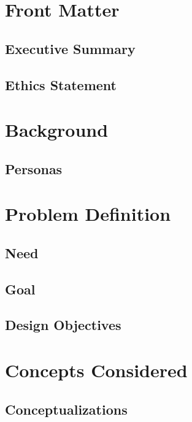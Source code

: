 \documentclass{article}
\begin{document}
\maketitle
\newpage

\section{Front Matter}
\subsection{Executive Summary}

\subsection{Ethics Statement}


\newpage
\tableofcontents
\newpage

\section{Background}
\subsection{Personas}






\section{Problem Definition}
\subsection{Need}

\subsection{Goal}

\subsection{Design Objectives}



\section{Concepts Considered}
\subsection{Conceptualizations}

\end{document}
